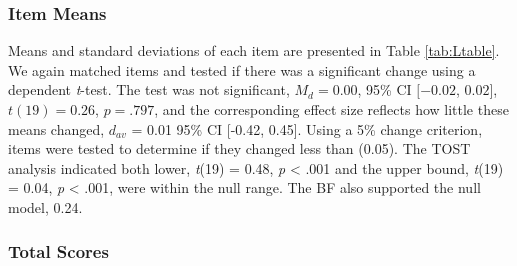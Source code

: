 \documentclass[english,man]{apa6}
\theoremstyle{definition}
\theoremstyle{definition}
\theoremstyle{definition}
\theoremstyle{remark}
\begin{document}
\subsubsection{Item Means}\label{item-means-1}

Means and standard deviations of each item are presented in Table
\ref{tab:Ltable}. We again matched items and tested if there was a
significant change using a dependent \emph{t}-test. The test was not
significant, \(M_d = 0.00\), 95\% CI \([-0.02\), \(0.02]\),
\(t(19) = 0.26\), \(p = .797\), and the corresponding effect size
reflects how little these means changed, \(d_{av}\) = 0.01 95\% CI
{[}-0.42, 0.45{]}. Using a 5\% change criterion, items were tested to
determine if they changed less than (0.05). The TOST analysis indicated
both lower, \emph{t}(19) = 0.48, \emph{p} \textless{} .001 and the upper
bound, \emph{t}(19) = 0.04, \emph{p} \textless{} .001, were within the
null range. The BF also supported the null model, 0.24.

\subsubsection{Total Scores}\label{total-scores-1}
\end{document}
